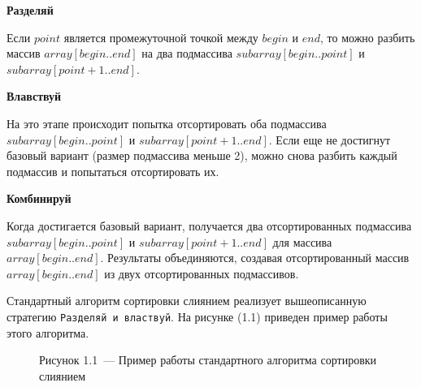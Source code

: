 \documentclass[12pt, a4paper]{report}
\begin{document}
\textbf{Разделяй}

Если $point$ является промежуточной точкой между $begin$ и $end$, то можно разбить массив $array[begin..end]$ на два подмассива $subarray[begin..point]$ и $subarray[point + 1..end]$.\newline

\textbf{Влавствуй}

На это этапе происходит попытка отсортировать оба подмассива\newline $subarray[begin..point]$ и $subarray[point + 1..end]$. Если еще не достигнут базовый вариант (размер подмассива меньше 2), можно снова разбить каждый подмассив и попытаться отсортировать их.\newline

\textbf{Комбинируй}

Когда достигается базовый вариант, получается два отсортированных подмассива $subarray[begin..point]$ и $subarray[point + 1..end]$ для массива\newline $array[begin..end]$. Результаты объединяются, создавая отсортированный массив $array[begin..end]$ из двух отсортированных подмассивов.\newline

Стандартный алгоритм сортировки слиянием реализует вышеописанную стратегию \verb|Разделяй и властвуй|. На рисунке (1.1) приведен пример работы этого алгоритма.

\begin{figure}[H]
\caption*{Рисунок 1.1~--- Пример работы стандартного алгоритма сортировки слиянием}
\end{figure}
\end{document}
